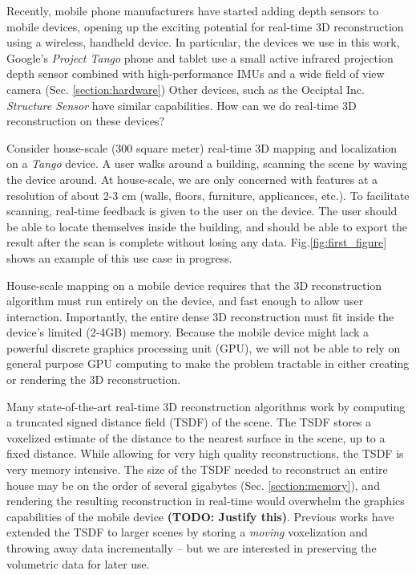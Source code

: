 \documentclass[10pt,twocolumn,letterpaper]{article}
\newcommand{\figref}[1]{Fig.\ref{#1}}
\begin{document}
Recently, mobile phone manufacturers have started adding
depth sensors to mobile devices, opening up the exciting potential for
real-time 3D reconstruction using a wireless, handheld device. In particular,
the devices we use in this work, Google's \textit{Project Tango} \cite{Tango}
phone and tablet use a small active infrared projection depth  sensor combined
with high-performance IMUs and a wide field of view camera (Sec.
\ref{section:hardware}) Other devices, such as the Occiptal Inc.
\textit{Structure Sensor} \cite{StructureSensor} have similar capabilities.  How
can we do real-time 3D reconstruction on these devices?

Consider house-scale (300 square meter) real-time 3D mapping and localization on
a \textit{Tango} device.  A user walks around a building, scanning the scene by
waving the device around. At house-scale, we are only concerned with features
at a resolution of about 2-3 cm (walls, floors, furniture, applicances, etc.).
To facilitate scanning, real-time feedback is given to the user on the device.
The user should be able to locate themselves inside the building, and should be
able to export the result after the scan is complete without losing any data.
\figref{fig:first_figure} shows an example of this use case in progress.

House-scale mapping on a mobile device requires that the 3D reconstruction
algorithm must run entirely on the device, and fast enough to allow user
interaction. Importantly, the entire dense 3D reconstruction must fit inside
the device's limited (2-4GB) memory. Because the mobile device might lack a
powerful discrete graphics processing unit (GPU), we will not be able to rely
on general purpose GPU computing to make the problem tractable in either
creating or rendering the 3D reconstruction.

Many state-of-the-art real-time 3D reconstruction algorithms \cite{Newcombe,
Whelan2013, WhelanLoopClose, Bylow2013} work by computing a truncated signed
distance field (TSDF) \cite{Curless1996} of the scene. The TSDF stores a
voxelized estimate of the distance to the nearest surface in the scene, up to a
fixed distance. While allowing for very high quality reconstructions, the TSDF
is very memory intensive. The size of the TSDF needed to reconstruct an entire
house may be on the order of several gigabytes  (Sec. \ref{section:memory}), and
rendering the resulting reconstruction in real-time would overwhelm the graphics
capabilities of the mobile device \textbf{(TODO: Justify this)}. Previous works
\cite{Whelan2013, WhelanLoopClose} have extended the TSDF to larger scenes by
storing a \textit{moving} voxelization and throwing away data incrementally --
but we are interested in preserving the volumetric data for later use.
\end{document}
